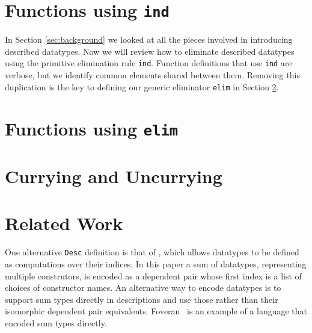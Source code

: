 \documentclass[preprint,nonatbib]{sigplanconf}
\begin{document}
\section{Functions using {\tt ind}}
\label{sec:ind}

In Section \ref{sec:background} we looked at all the pieces involved
in introducing described datatypes. Now we will review how to
eliminate described datatypes using the primitive elimination
rule {\tt ind}. Function definitions that use {\tt ind} are verbose,
but we identify common elements shared between them. Removing
this duplication is the key to defining our generic eliminator
{\tt elim} in Section \ref{sec:elim}.




\section{Functions using {\tt elim}}
\label{sec:elim}

\section{Currying and Uncurrying}
\label{sec:curry}


\section{Related Work}
\label{sec:related-work}

One alternative {\tt Desc} definition is that of \citet{dagand:phd}, which
allows datatypes to be defined as computations over their indices.
In this paper a sum of datatypes, representing multiple construtors,
is encoded as a dependent pair whose first index is a list of choices
of constructor names. An alternative way to encode datatypes is to
support sum types directly in descriptions and use those rather than
their isomorphic dependent pair equivalents. Foveran~\citep{foveran} is
an example of a language that encoded sum types directly.


\acks




\end{document}

